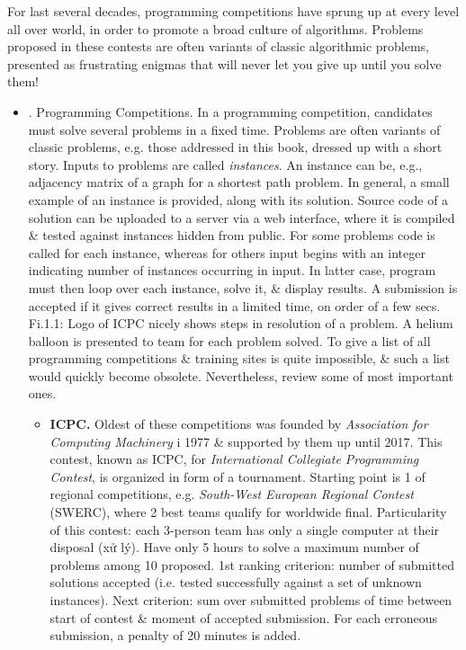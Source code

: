 \documentclass{article}
\begin{document}
\begin{itemize}
	For last several decades, programming competitions have sprung up at every level all over world, in order to promote a broad culture of algorithms. Problems proposed in these contests are often variants of classic algorithmic problems, presented as frustrating enigmas that will never let you give up until you solve them!
	\begin{itemize}
		\item {. Programming Competitions.} In a programming competition, candidates must solve several problems in a fixed time. Problems are often variants of classic problems, e.g. those addressed in this book, dressed up with a short story. Inputs to problems are called {\it instances}. An instance can be, e.g., adjacency matrix of a graph for a shortest path problem. In general, a small example of an instance is provided, along with its solution. Source code of a solution can be uploaded to a server via a web interface, where it is compiled \& tested against instances hidden from public. For some problems code is called for each instance, whereas for others input begins with an integer indicating number of instances occurring in input. In latter case, program must then loop over each instance, solve it, \& display results. A submission is accepted if it gives correct results in a limited time, on order of a few secs. {\sf Fi.1.1: Logo of ICPC nicely shows steps in resolution of a problem. A helium balloon is presented to team for each problem solved.} To give a list of all programming competitions \& training sites is quite impossible, \& such a list would quickly become obsolete. Nevertheless, review some of most important ones.
		\begin{itemize}
			\item {\bf ICPC.} Oldest of these competitions was founded by {\it Association for Computing Machinery} i 1977 \& supported by them up until 2017. This contest, known as ICPC, for {\it International Collegiate Programming Contest}, is organized in form of a tournament. Starting point is 1 of regional competitions, e.g. {\it South-West European Regional Contest} (SWERC), where 2 best teams qualify for worldwide final. Particularity of this contest: each 3-person team has only a single computer at their disposal (xử lý). Have only 5 hours to solve a maximum number of problems among 10 proposed. 1st ranking criterion: number of submitted solutions accepted (i.e. tested successfully against a set of unknown instances). Next criterion: sum over submitted problems of time between start of contest \& moment of accepted submission. For each erroneous submission, a penalty of 20 minutes is added.
			

\end{itemize}
\end{itemize}
\end{itemize}
\end{document}
